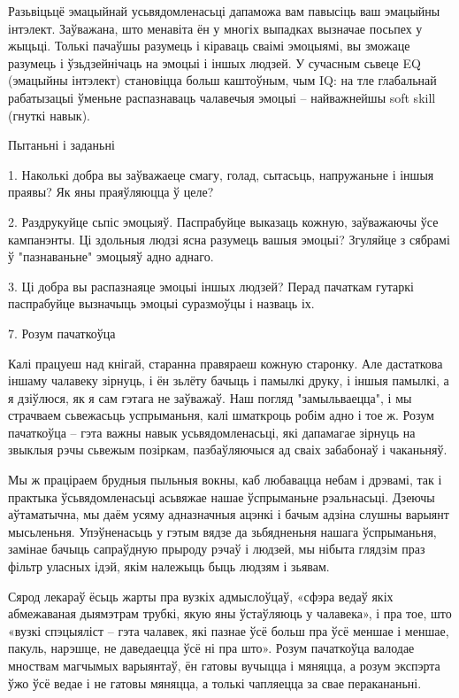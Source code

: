Разьвіцьцё эмацыйнай усьвядомленасьці дапаможа вам павысіць ваш эмацыйны інтэлект. Заўважана, што менавіта ён у многіх выпадках вызначае посьпех у жыцьці. Толькі пачаўшы разумець і кіраваць сваімі эмоцыямі, вы зможаце разумець і ўзьдзейнічаць на эмоцыі і іншых людзей. У сучасным сьвеце EQ (эмацыйны інтэлект) становіцца больш каштоўным, чым IQ: на тле глабальнай рабатызацыі ўменьне распазнаваць чалавечыя эмоцыі – найважнейшы soft skill (гнуткі навык).

Пытаньні і заданьні

1. Наколькі добра вы заўважаеце смагу, голад, сытасьць, напружаньне і іншыя праявы? Як яны праяўляюцца ў целе?

2. Раздрукуйце сьпіс эмоцыяў. Паспрабуйце выказаць кожную, заўважаючы ўсе кампанэнты. Ці здольныя людзі ясна разумець вашыя эмоцыі? Згуляйце з сябрамі ў "пазнаваньне" эмоцыяў адно аднаго.

3. Ці добра вы распазнаяце эмоцыі іншых людзей? Перад пачаткам гутаркі паспрабуйце вызначыць эмоцыі суразмоўцы і назваць іх.


7. Розум пачаткоўца

Калі працуеш над кнігай, старанна правяраеш кожную старонку. Але дастаткова іншаму чалавеку зірнуць, і ён зьлёту бачыць і памылкі друку, і іншыя памылкі, а я дзіўлюся, як я сам гэтага не заўважаў. Наш погляд "замыльваецца", і мы страчваем сьвежасьць успрыманьня, калі шматкроць робім адно і тое ж. Розум пачаткоўца – гэта важны навык усьвядомленасьці, які дапамагае зірнуць на звыклыя рэчы сьвежым позіркам, пазбаўляючыся ад сваіх забабонаў і чаканьняў.

Мы ж праціраем брудныя пыльныя вокны, каб любавацца небам і дрэвамі, так і практыка ўсьвядомленасьці асьвяжае нашае ўспрыманьне рэальнасьці. Дзеючы аўтаматычна, мы даём усяму адназначныя ацэнкі і бачым адзіна слушны варыянт мысьленьня. Упэўненасьць у гэтым вядзе да зьбядненьня нашага ўспрыманьня, замінае бачыць сапраўдную прыроду рэчаў і людзей, мы нібыта глядзім праз фільтр уласных ідэй, якім належыць быць людзям і зьявам.

Сярод лекараў ёсьць жарты пра вузкіх адмыслоўцаў, «сфэра ведаў якіх абмежаваная дыямэтрам трубкі, якую яны ўстаўляюць у чалавека», і пра тое, што «вузкі спэцыяліст – гэта чалавек, які пазнае ўсё больш пра ўсё меншае і меншае, пакуль, нарэшце, не даведаецца ўсё ні пра што». Розум пачаткоўца валодае мноствам магчымых варыянтаў, ён гатовы вучыцца і мяняцца, а розум экспэрта ўжо ўсё ведае і не гатовы мяняцца, а толькі чапляецца за свае перакананьні.

